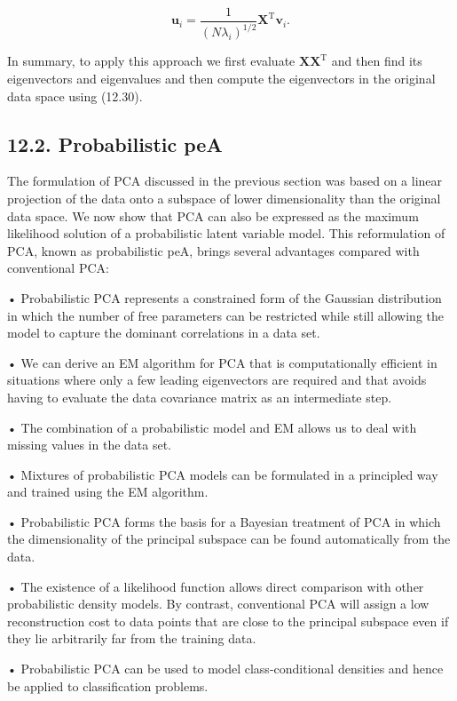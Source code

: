 \documentclass[
  10
]{article}
\begin{document}
\[
\mathbf {u} _ {i} = \frac {1}{(N \lambda_ {i}) ^ {1 / 2}} \mathbf {X} ^ {\mathrm{T}} \mathbf {v} _ {i}.\tag{12.30}
\]

In summary, to apply this approach we first evaluate
\(\mathbf { X X ^ { \mathrm { { T } } } }\) and then find its
eigenvectors and eigenvalues and then compute the eigenvectors in the
original data space using (12.30).

\subsection{12.2. Probabilistic peA}\label{probabilistic-pea}

The formulation of PCA discussed in the previous section was based on a
linear projection of the data onto a subspace of lower dimensionality
than the original data space. We now show that PCA can also be expressed
as the maximum likelihood solution of a probabilistic latent variable
model. This reformulation of PCA, known as probabilistic peA, brings
several advantages compared with conventional PCA:

• Probabilistic PCA represents a constrained form of the Gaussian
distribution in which the number of free parameters can be restricted
while still allowing the model to capture the dominant correlations in a
data set.

• We can derive an EM algorithm for PCA that is computationally
efficient in situations where only a few leading eigenvectors are
required and that avoids having to evaluate the data covariance matrix
as an intermediate step.

• The combination of a probabilistic model and EM allows us to deal with
missing values in the data set.

• Mixtures of probabilistic PCA models can be formulated in a principled
way and trained using the EM algorithm.

• Probabilistic PCA forms the basis for a Bayesian treatment of PCA in
which the dimensionality of the principal subspace can be found
automatically from the data.

• The existence of a likelihood function allows direct comparison with
other probabilistic density models. By contrast, conventional PCA will
assign a low reconstruction cost to data points that are close to the
principal subspace even if they lie arbitrarily far from the training
data.

• Probabilistic PCA can be used to model class-conditional densities and
hence be applied to classification problems.
\end{document}
